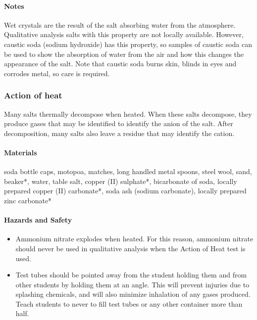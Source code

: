 \paragraph{Notes}

Wet crystals are the result of the salt absorbing water from the atmosphere. Qualitative analysis salts with this property are not locally available. However, caustic soda (sodium hydroxide) has this property, so samples of caustic soda can be used to show the absorption of water from the air and how this changes the appearance of the salt. Note that caustic soda burns skin, blinds in eyes and corrodes metal, so care is required.
\subsubsection{Action of heat}

Many salts thermally decompose when heated. When these salts decompose, they produce gases that may be identified to identify the anion of the salt. After decomposition, many salts also leave a residue that may identify the cation.

\paragraph{Materials}
soda bottle caps, motopoa, matches, long handled metal spoons, steel wool, sand, beaker*, water, table salt, copper (II) sulphate*, bicarbonate of soda, locally prepared copper (II) carbonate*, soda ash (sodium carbonate), locally prepared zinc carbonate*


\paragraph{Hazards and Safety}
\begin{itemize}
\item{Ammonium nitrate explodes when heated. For this reason, ammonium nitrate should never be used in qualitative analysis when the Action of Heat test is used.}
\item Test tubes should be pointed away from the student holding them and
from other students by holding them at an angle. This will prevent
injuries due to splashing chemicals, and will also minimize inhalation
of any gases produced. Teach students to never to fill test tubes or
any other container more than half.
\end{itemize}

